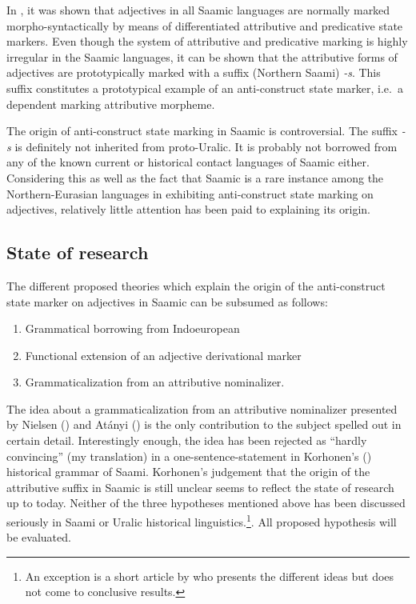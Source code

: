 {In , it was shown that adjectives in all Saamic languages are normally marked morpho-syntactically by means of differentiated attributive and predicative state markers. Even though the system of attributive and predicative marking is highly irregular in the Saamic languages, it can be shown that the attributive forms of adjectives are prototypically marked with a suffix (Northern Saami) \textit{-s}. This suffix constitutes a prototypical example of an anti-construct state marker, i.e.~a dependent marking attributive morpheme.

The origin of anti-construct state marking in Saamic is controversial. The suffix \textit{-s} is definitely not inherited from proto-Uralic. It is probably not borrowed from any of the known current or historical contact languages of Saamic either. Considering this as well as the fact that Saamic is a rare instance among the Northern-Eurasian languages in exhibiting anti-construct state marking on adjectives, relatively little attention has been paid to explaining its origin.

\subsection{State of research}

The different proposed theories which explain the origin of the anti-construct state marker on adjectives in Saamic can be subsumed as follows:
\begin{enumerate}
\item Grammatical borrowing from Indoeuropean
\item Functional extension of an adjective derivational marker
\item Grammaticalization from an attributive nominalizer.
\end{enumerate}

\noindent The idea about a grammaticalization from an attributive nominalizer presented by Nielsen (\citeyear{nielsen1933}) and Atányi (\citeyear{atanyi1942,atanyi1943}) is the only contribution to the subject spelled out in certain detail. Interestingly enough, the idea has been rejected as “hardly convincing” (my translation) in a one-sentence-statement in Korhonen's (\citeyear{korhonen-m1981}) historical grammar of Saami. Korhonen's judgement that the origin of the attributive suffix in Saamic is still unclear \cite[246]{korhonen-m1981} seems to reflect the state of research up to today. Neither of the three hypotheses mentioned above has been discussed seriously in Saami or Uralic historical linguistics.\footnote{An exception is a short article by \cite{sarv-m2001} who presents the different ideas but does not come to conclusive results.}. All proposed hypothesis will be evaluated.

}
